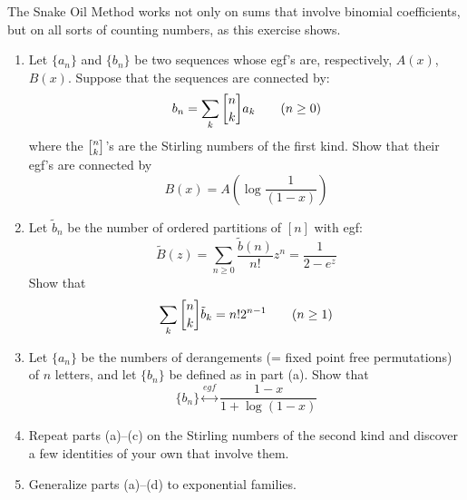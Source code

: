 \begin{exercise}
    The Snake Oil Method works not only on sums that involve binomial coefficients, but on all sorts of counting numbers, as this exercise shows.
    \begin{enumerate}[label=(\alph*)]
        \item Let $\{a_n\}$ and $\{b_n\}$ be two sequences whose egf's are, respectively, $A(x)$, $B(x)$. Suppose that the sequences are connected by:
        \[
            b_n = \sum_k \stirlingFst{n}{k}a_k \qquad (n\geq 0)
        \]
        where the $\stirlingFst{n}{k}$'s are the Stirling numbers of the first kind. Show that their egf's are connected by
        \[
            B(x) = A\left(\log\frac{1}{(1-x)}\right)
        \]
        \item \hypertarget{eq:ch4:12:b}{} Let $\tilde{b}_n$ be the number of ordered partitions of $[n]$ with egf:
        \[
            \tilde{B}(z) = \sum_{n\geq 0}\frac{\tilde{b}(n)}{n!}z^n = \frac{1}{2-e^z}
        \]
        Show that
        \[
            \sum_k \stirlingFst{n}{k}\tilde{b}_k = n!2^{n-1} \qquad (n\geq 1)
        \]
        \item \hypertarget{eq:ch4:12:c}{} Let $\{a_n\}$ be the numbers of derangements (= fixed point free permutations) of $n$ letters, and let $\{b_n\}$ be defined as in part (a). Show that 
        \[
            \{b_n\} \stackrel{egf}{\longleftrightarrow} \frac{1-x}{1+\log(1-x)}
        \]
        \item Repeat parts (a)--(c) on the Stirling numbers of the second kind and discover a few identities of your own that involve them.
        \item Generalize parts (a)--(d) to exponential families.
    \end{enumerate}
\end{exercise}
